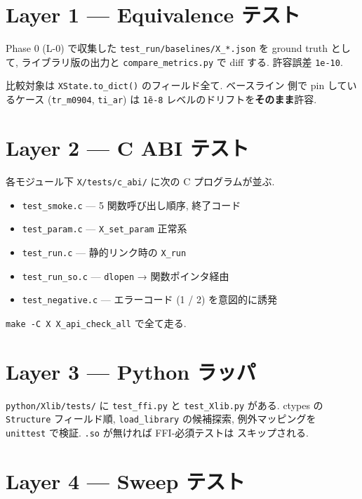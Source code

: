 \documentclass[11pt,a4paper]{report}
\begin{document}
\section{Layer 1 — Equivalence テスト}

Phase 0 (L-0) で収集した \texttt{test\_run/baselines/X\_*.json} を
ground truth として, ライブラリ版の出力と \texttt{compare\_metrics.py}
で diff する. 許容誤差 \texttt{1e-10}.

比較対象は \texttt{XState.to\_dict()} のフィールド全て. ベースライン
側で pin しているケース (\texttt{tr\_m0904}, \texttt{ti\_ar}) は
\texttt{\~1e-8} レベルのドリフトを\textbf{そのまま}許容.

\section{Layer 2 — C ABI テスト}

各モジュール下 \texttt{X/tests/c\_abi/} に次の C プログラムが並ぶ.

\begin{itemize}[leftmargin=1.5em]
  \item \texttt{test\_smoke.c} — 5 関数呼び出し順序, 終了コード
  \item \texttt{test\_param.c} — \texttt{X\_set\_param} 正常系
  \item \texttt{test\_run.c}   — 静的リンク時の \texttt{X\_run}
  \item \texttt{test\_run\_so.c} — \texttt{dlopen} → 関数ポインタ経由
  \item \texttt{test\_negative.c} — エラーコード (1 / 2) を意図的に誘発
\end{itemize}

\texttt{make -C X X\_api\_check\_all} で全て走る.

\section{Layer 3 — Python ラッパ}

\texttt{python/Xlib/tests/} に \texttt{test\_ffi.py} と
\texttt{test\_Xlib.py} がある. ctypes の \texttt{Structure} フィールド順,
\texttt{load\_library} の候補探索, 例外マッピングを
\texttt{unittest} で検証. \texttt{.so} が無ければ FFI-必須テストは
スキップされる.

\section{Layer 4 — Sweep テスト}
\end{document}
